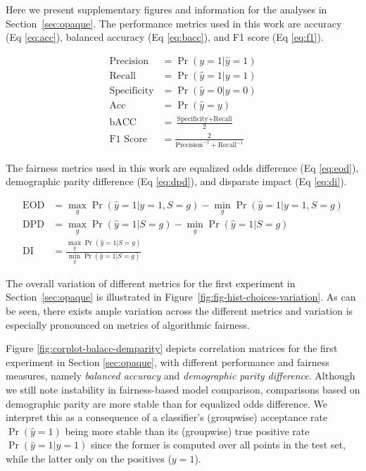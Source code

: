 Here we present supplementary figures and information for the analyses in Section~\ref{sec:opaque}. The performance metrics used in this work are accuracy (Eq \ref{eq:acc}), balanced accuracy (Eq \ref{eq:bacc}), and F1 score (Eq \ref{eq:f1}).

\begin{align}
    \text{Precision} &= \Pr(y=1|\hat{y}=1) \nonumber \\
    \text{Recall} &= \Pr(\hat{y}=1|y=1) \nonumber \\
    \text{Specificity} &= \Pr(\hat{y}=0|y=0) \nonumber \\
    \text{Acc} &= \Pr(\hat{y}=y)  \label{eq:acc} \\
    \text{bACC} &= \frac{\text{Specificity} + \text{Recall}}{2}  \label{eq:bacc} \\
    \text{F1 Score} &= \frac{2}{\text{Precision}^{-1}+\text{Recall}^{-1}} \label{eq:f1}
\end{align}

The fairness metrics used in this work are equalized odds difference  (Eq \ref{eq:eod}), demographic parity difference (Eq \ref{eq:dpd}), and disparate impact (Eq \ref{eq:di}).

\begin{align}
    \text{EOD} &= \max_g \Pr(\hat{y}=1|y=1, S=g) - \min_g \Pr(\hat{y}=1|y=1, S=g)\label{eq:eod} \\
    \text{DPD} &= \max_g \Pr(\hat{y}=1|S=g) - \min_g \Pr(\hat{y}=1|S=g)\label{eq:dpd} \\
    \text{DI} &= \frac{\max_g \Pr(\hat{y}=1|S=g)}{ \min_g \Pr(\hat{y}=1|S=g)} \label{eq:di} 
\end{align}

The overall variation of different metrics for the first experiment in Section~\ref{sec:opaque} is illustrated in Figure~\ref{fig:fig-hist-choices-variation}. As can be seen, there exists ample variation across the different metrics and variation is especially pronounced on metrics of algorithmic fairness.

Figure \ref{fig:corplot-balacc-demparity} depicts correlation matrices for the first experiment in Section \ref{sec:opaque}, with different performance and fairness measures, namely \emph{balanced accuracy} and \emph{demographic parity difference}. Although we still note instability in fairness-based model comparison, comparisons based on demographic parity are more stable than for equalized odds difference. We interpret this as a consequence of a classifier's (groupwise) acceptance rate $\Pr(\hat{y}=1)$ being more stable than its (groupwise) true positive rate $\Pr(\hat{y}=1|y=1)$ since the former is computed over all points in the test set, while the latter only on the positives ($y=1$). 

